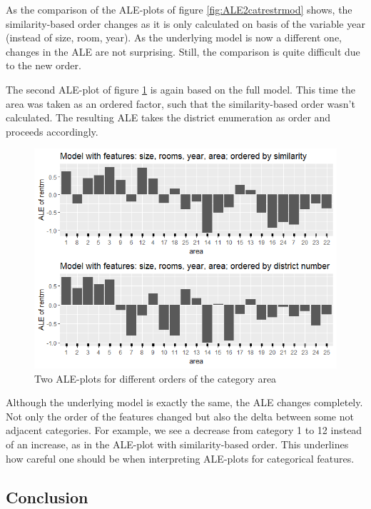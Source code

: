 \documentclass[]{krantz}
\begin{document}
As the comparison of the ALE-plots of figure \ref{fig:ALE2catrestrmod}
shows, the similarity-based order changes as it is only calculated on
basis of the variable year (instead of size, room, year). As the
underlying model is now a different one, changes in the ALE are not
surprising. Still, the comparison is quite difficult due to the new
order.

The second ALE-plot of figure \ref{fig:ALE2catdifford} is again based on
the full model. This time the area was taken as an ordered factor, such
that the similarity-based order wasn't calculated. The resulting ALE
takes the district enumeration as order and proceeds accordingly.

\begin{figure}
\includegraphics[width=1\linewidth]{images/ALE_2_cat_different_orders_} \caption{Two ALE-plots for different orders of the category
area}\label{fig:ALE2catdifford}
\end{figure}




Although the underlying model is exactly the same, the ALE changes
completely. Not only the order of the features changed but also the
delta between some not adjacent categories. For example, we see a
decrease from category 1 to 12 instead of an increase, as in the
ALE-plot with similarity-based order. This underlines how careful one
should be when interpreting ALE-plots for categorical features.

\subsection{Conclusion}\label{conclusion-1}
\end{document}

